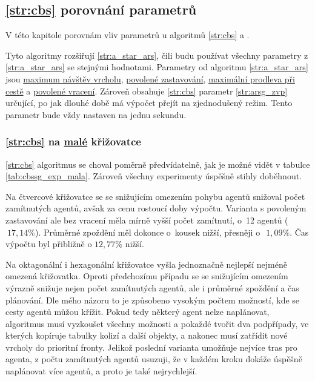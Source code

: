 \subsection{\ref{str:cbs} porovnání parametrů}\label{subsec:cbs_porovnani_parametru}

V této kapitole porovnám vliv parametrů u algoritmů \ref{str:cbs} a .

Tyto algoritmy rozšiřují \ref{str:a_star_ars},
čili budu používat všechny parametry z \ref{str:a_star_ars} se stejnými hodnotami.
Parametry od algoritmu \ref{str:a_star_ars} jsou \hyperref[par:ars_mnv]{maximum návštěv vrcholu},
\hyperref[par:ars_pz]{povolené zastavování}, \hyperref[par:ars_mpc]{maximální prodleva při cestě} a
\hyperref[par:ars_pv]{povolené vracení}.
Zároveň obsahuje \ref{str:cbs} parametr \ref{str:arsg_zvp} určující,
po jak dlouhé době má výpočet přejít na zjednodušený režim.
Tento parametr bude vždy nastaven na jednu sekundu.

\subsubsection{\ref{str:cbs} na \hyperref[par:data_mala]{malé} křižovatce}
\label{subsubsec:exp_cbssg_mala_krizovatka}

\ref{str:cbs} algoritmus se choval poměrně předvídatelně, jak je možné vidět v tabulce \ref{tab:cbssg_exp_mala}.
Zároveň všechny experimenty úspěšně stihly doběhnout.

Na čtvercové křižovatce se se snižujícím omezením pohybu agentů snižoval počet zamítnutých agentů,
avšak za cenu rostoucí doby výpočtu.
Varianta s povoleným zastavování ale bez vracení měla mírně vyšší počet zamítnutí, o~12 agentů ($~17,14\%$).
Průměrné zpoždění měl dokonce o~kousek nižší, přesněji o~$~1,09\%$.
Čas výpočtu byl přibližně o $12,77\%$ nižší.

Na oktagonální i hexagonální křižovatce vyšla jednoznačně nejlepší nejméně omezená křižovatka.
Oproti předchozímu případu se se snižujícím omezením výrazně snižuje nejen počet zamítnutých agentů,
ale i průměrné zpoždění a čas plánování.
Dle mého názoru to je způsobeno vysokým počtem možností, kde se cesty agentů můžou křížit.
Pokud tedy některý agent nelze naplánovat, algoritmus musí vyzkoušet všechny možnosti
a pokaždé tvořit dva podpřípady, ve kterých kopíruje tabulky kolizí a další objekty,
a nakonec musí zatřídit nové vrcholy do prioritní fronty.
Jelikož poslední varianta umožňuje nejvíce tras pro agenta, z počtu zamítnutých agentů usuzuji,
že v každém kroku dokáže úspěšně naplánovat více agentů, a proto je také nejrychlejší.

